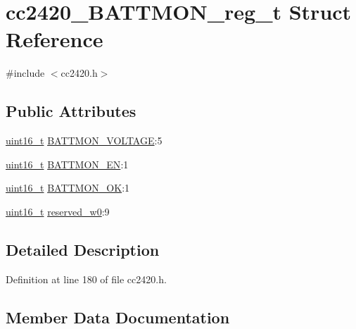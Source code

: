 \hypertarget{structcc2420___b_a_t_t_m_o_n__reg__t}{}\section{cc2420\+\_\+\+B\+A\+T\+T\+M\+O\+N\+\_\+reg\+\_\+t Struct Reference}
\label{structcc2420___b_a_t_t_m_o_n__reg__t}


{\ttfamily \#include $<$cc2420.\+h$>$}

\subsection*{Public Attributes}
\begin{DoxyCompactItemize}
\item 
\hyperlink{_p_e___types_8h_a1f1825b69244eb3ad2c7165ddc99c956}{uint16\+\_\+t} \hyperlink{structcc2420___b_a_t_t_m_o_n__reg__t_ae3ed1cbd8dd5259796efdbd9c1d86b53}{B\+A\+T\+T\+M\+O\+N\+\_\+\+V\+O\+L\+T\+A\+GE}\+:5
\item 
\hyperlink{_p_e___types_8h_a1f1825b69244eb3ad2c7165ddc99c956}{uint16\+\_\+t} \hyperlink{structcc2420___b_a_t_t_m_o_n__reg__t_aa37943b435159fa2d547f573edaa3862}{B\+A\+T\+T\+M\+O\+N\+\_\+\+EN}\+:1
\item 
\hyperlink{_p_e___types_8h_a1f1825b69244eb3ad2c7165ddc99c956}{uint16\+\_\+t} \hyperlink{structcc2420___b_a_t_t_m_o_n__reg__t_afe950a285302eeec12bff2e3d654e660}{B\+A\+T\+T\+M\+O\+N\+\_\+\+OK}\+:1
\item 
\hyperlink{_p_e___types_8h_a1f1825b69244eb3ad2c7165ddc99c956}{uint16\+\_\+t} \hyperlink{structcc2420___b_a_t_t_m_o_n__reg__t_aa857d1dee55fa0e97bcd2be25bb4550c}{reserved\+\_\+w0}\+:9
\end{DoxyCompactItemize}


\subsection{Detailed Description}


Definition at line 180 of file cc2420.\+h.



\subsection{Member Data Documentation}
